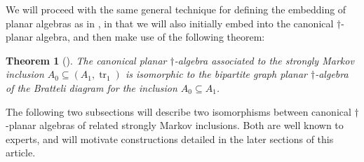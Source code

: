 \documentclass[11pt]{article}
\theoremstyle{plain}
\newtheorem{thm}{Theorem}[section]
\theoremstyle{definition}
\DeclareMathOperator{\tr}{tr}
\begin{document}
% 

We will proceed with the same general technique for defining the embedding of planar algebras as in \cite{MR2812459}, in that we will also initially embed into the canonical $\dag$-planar algebra, and then make use of the following theorem:

\begin{thm}[{\cite[Theorem 3.28]{MR2812459}}] \label{planaralgebraisomorphism}
The canonical planar $\dag$-algebra associated to the strongly Markov inclusion $A_0\subseteq (A_1,\tr_1)$ is isomorphic to the bipartite graph planar $\dag$-algebra of the Bratteli diagram for the inclusion $A_0\subseteq A_1$.
\end{thm}



The following two subsections will describe two isomorphisms between canonical $\dag$-planar algebras of related strongly Markov inclusions. Both are well known to experts, and will motivate constructions detailed in the later sections of this article.
\end{document}
